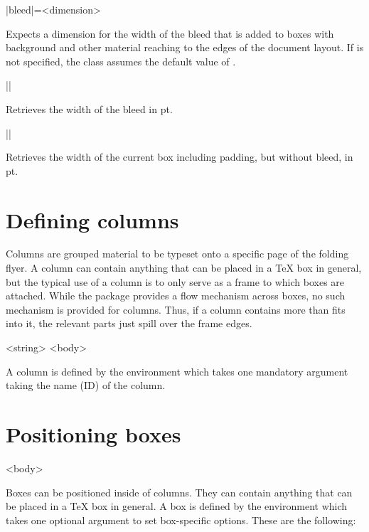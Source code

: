 \documentclass[a4paper]{article}
\begin{document}
\begin{macrodef}
|bleed|={<dimension>}
\end{macrodef}
Expects a dimension for the width of the bleed that is added to boxes with background and other material reaching to the edges of the document layout. If  is not specified, the class assumes the default value of \macro{3mm}.

\begin{macrodef}
|\leporellobleed|
\end{macrodef}
Retrieves the width of the bleed in pt.

\begin{macrodef}
|\leporelloboxwidth|
\end{macrodef}
Retrieves the width of the current box including padding, but without bleed, in pt.

\section{Defining columns}

Columns are grouped material to be typeset onto a specific page of the folding flyer. A column can contain anything that can be placed in a TeX box in general, but the typical use of a column is to only serve as a frame to which boxes are attached. While the package provides a flow mechanism across boxes, no such mechanism is provided for columns. Thus, if a column contains more than fits into it, the relevant parts just spill over the frame edges.

\begin{macrodef}
\null\begin{|leporellocolumn|}{<string>}
  <body>
\end{|leporellocolumn|}
\end{macrodef}
A column is defined by the  environment which takes one mandatory argument taking the name (ID) of the column.

\section{Positioning boxes}

\begin{macrodef}
\null\begin{|leporellobox|}[<options>]
  <body>
\end{|leporellobox|}
\end{macrodef}
Boxes can be positioned inside of columns. They can contain anything that can be placed in a TeX box in general. A box is defined by the  environment which takes one optional argument to set box-specific options. These are the following:
\end{document}
